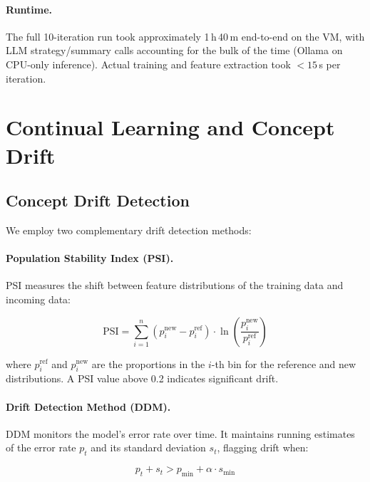 \documentclass[12pt,a4paper]{article}
\begin{document}
\paragraph{Runtime.} The full 10-iteration run took approximately 1\,h\,40\,m end-to-end on the VM, with LLM strategy/summary calls accounting for the bulk of the time (Ollama on CPU-only inference). Actual training and feature extraction took $<15$\,s per iteration.

\section{Continual Learning and Concept Drift}
\label{sec:continual}

\subsection{Concept Drift Detection}

We employ two complementary drift detection methods:

\paragraph{Population Stability Index (PSI).}

PSI measures the shift between feature distributions of the training data and incoming data:

\begin{equation}
    \text{PSI} = \sum_{i=1}^{n} (p_i^{\text{new}} - p_i^{\text{ref}}) \cdot \ln\left(\frac{p_i^{\text{new}}}{p_i^{\text{ref}}}\right)
\end{equation}

where $p_i^{\text{ref}}$ and $p_i^{\text{new}}$ are the proportions in the $i$-th bin for the reference and new distributions. A PSI value above 0.2 indicates significant drift.

\paragraph{Drift Detection Method (DDM).}

DDM monitors the model's error rate over time. It maintains running estimates of the error rate $p_t$ and its standard deviation $s_t$, flagging drift when:

\begin{equation}
    p_t + s_t > p_{\min} + \alpha \cdot s_{\min}
\end{equation}
\end{document}
